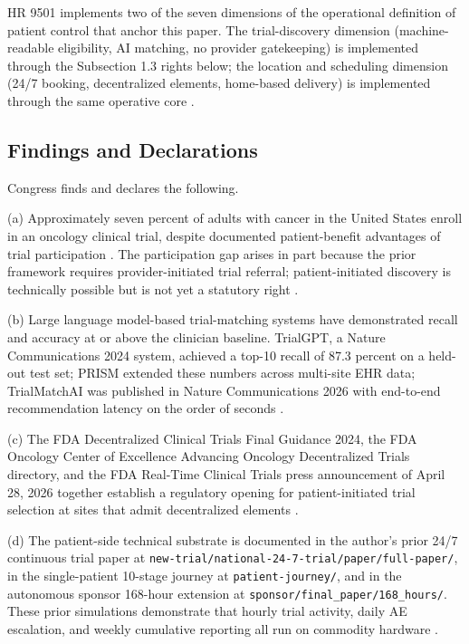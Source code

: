 HR 9501 implements two of the seven dimensions of the operational
definition of patient control that anchor this paper. The trial-discovery dimension (machine-readable eligibility, AI matching, no
provider gatekeeping) is implemented through the Subsection 1.3 rights
below; the location and scheduling dimension (24/7 booking,
decentralized elements, home-based delivery) is implemented through
the same operative core \cite{jin2024trialgpt, gupta2024prism,
abdallah2026trialmatchai, fda_dct_guidance_2024,
fda_oce_advancing_oncology_dct_2024, dronca2026cancer_care_beyond_walls,
kawchak_2026_19994945}.

\subsection{Findings and Declarations}

\hspace{0.5cm} Congress finds and declares the following.

(a) Approximately seven percent of adults with cancer in the United
States enroll in an oncology clinical trial, despite documented
patient-benefit advantages of trial participation
\cite{kawchak_2026_19994945}. The participation gap arises in part
because the prior framework requires provider-initiated trial referral;
patient-initiated discovery is technically possible but is not yet a
statutory right \cite{rank2_clinical_treatment_act_2020,
rank3_aca_clinical_trials_2010}.

(b) Large language model-based trial-matching systems have demonstrated
recall and accuracy at or above the clinician baseline. TrialGPT, a
Nature Communications 2024 system, achieved a top-10 recall of 87.3
percent on a held-out test set; PRISM extended these numbers across
multi-site EHR data; TrialMatchAI was published in Nature
Communications 2026 with end-to-end recommendation latency on the
order of seconds \cite{jin2024trialgpt, gupta2024prism,
abdallah2026trialmatchai}.

(c) The FDA Decentralized Clinical Trials Final Guidance 2024, the
FDA Oncology Center of Excellence Advancing Oncology Decentralized
Trials directory, and the FDA Real-Time Clinical Trials press
announcement of April 28, 2026 together establish a regulatory
opening for patient-initiated trial selection at sites that admit
decentralized elements \cite{fda_dct_guidance_2024,
fda_oce_advancing_oncology_dct_2024, fda_rtct_press_2026}.

(d) The patient-side technical substrate is documented in the
author's prior 24/7 continuous trial paper at
\texttt{new-trial/national-24-7-trial/paper/full-paper/}, in the
single-patient 10-stage journey at \texttt{patient-journey/}, and in
the autonomous sponsor 168-hour extension at
\texttt{sponsor/final\_paper/168\_hours/}. These prior simulations
demonstrate that hourly trial activity, daily AE escalation, and
weekly cumulative reporting all run on commodity hardware
\cite{kawchak_2026_19994945, kawchak_2026_19119939,
kawchak_2026_19396256}.

